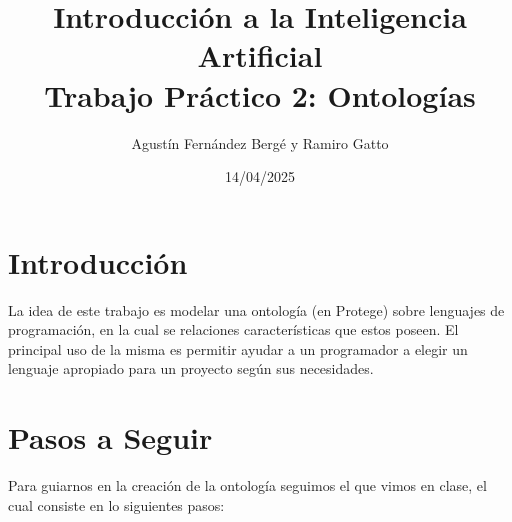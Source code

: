\documentclass[12pt, titlepage, a4paper]{article}
\title{Introducción a la Inteligencia Artificial \\
Trabajo Práctico 2: Ontologías }
\author{Agustín Fernández Bergé y Ramiro Gatto}
\date{14/04/2025}
\begin{document}
\maketitle
    

\section{Introducción}
La idea de este trabajo es modelar una ontología 
(en Protege) sobre lenguajes de  
programación, en la cual se relaciones características que estos 
poseen. El principal uso de la misma es permitir ayudar a un programador
a elegir un lenguaje apropiado para un proyecto según sus necesidades. 

\section{Pasos a Seguir}
Para guiarnos en la creación de la ontología seguimos el  que 
vimos en clase, el cual consiste en lo siguientes pasos:
\end{document}
